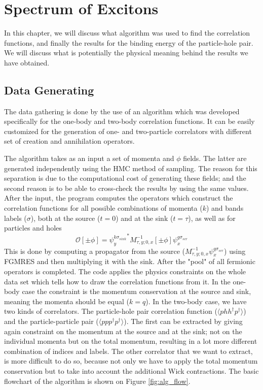 
\chapter{Spectrum of Excitons}
\label{sec:excitons}
In this chapter, we will discuss what algorithm was used to find the correlation functions, and finally the results for the binding energy of the particle-hole pair. We will discuss what is potentially the physical meaning behind the results we have obtained.

\section{Data Generating}

The data gathering is done by the use of an algorithm which was developed specifically for the one-body and two-body correlation functions. It can be easily customized for the generation of one- and two-particle correlators with different set of creation and annihilation operators.

The algorithm takes as an input a set of momenta and $\phi$ fields. The latter are generated independently using the HMC method of sampling. The reason for this separation is due to the computational cost of generating these fields; and  the second reason is to be able to cross-check the results by using the same values. After the input, the program computes the operators which construct the correlation functions for all possible combinations of momenta ($k$) and bands labels ($\sigma$), both at the source ($t=0$) and at the sink ($t=\tau$), as well as for particles and holes
\begin{equation}
    \mathcal{O}[\pm\phi] = {\psi^{k\sigma_{sink}}_{y}}^{*}M^{-1}_{\tau,y;0,x}[\pm\phi]\psi^{q\sigma_{scr}}_{x}
\end{equation}
This is done by computing a propagator from the source ($M^{-1}_{\tau,y;0,x}\psi^{q\sigma_{scr}}_{x}$) using FGMRES and then multiplying it with the sink. After the "pool" of all fermionic operators is completed. The code applies the physics constraints on the whole data set which tells how to draw the correlation functions from it. In the one-body case the constraint is the momentum conservation at the source and sink, meaning the momenta should be equal ($k=q$). In the two-body case, we have two kinds of correlators. The particle-hole pair correlation function ($\langle phh^\dagger p^\dagger\rangle$) and the particle-particle pair ($\langle ppp^\dagger p^\dagger\rangle$). The first can be extracted by giving again constraint on the momentum at the source and at the sink; not on the individual momenta but on the total momentum, resulting in a lot more different combination of indices and labels. The other correlator that we want to extract, is more difficult to do so, because not only we have to apply the total momentum conservation but to take into account the additional Wick contractions. The basic flowchart of the algorithm is shown on Figure \ref{fig:alg_flow}.

